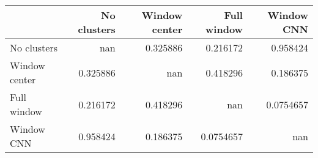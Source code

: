 \begin{tabular}{lrrrr}
\toprule
               &   No clusters &   Window center &   Full window &   Window CNN \\
\midrule
 No clusters   &    nan        &        0.325886 &     0.216172  &    0.958424  \\
 Window center &      0.325886 &      nan        &     0.418296  &    0.186375  \\
 Full window   &      0.216172 &        0.418296 &   nan         &    0.0754657 \\
 Window CNN    &      0.958424 &        0.186375 &     0.0754657 &  nan         \\
\bottomrule
\end{tabular}